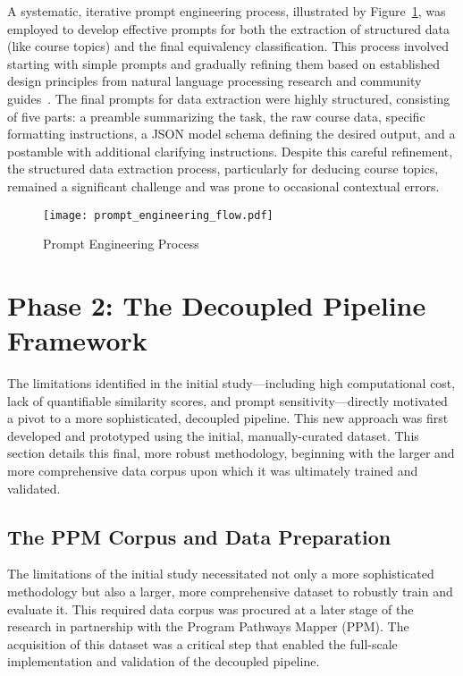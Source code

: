A systematic, iterative prompt engineering process, illustrated by Figure~\ref{fig:prompt_engineering_process}, was employed to develop effective prompts for both the extraction of structured data (like course topics) and the final equivalency classification. This process involved starting with simple prompts and gradually refining them based on established design principles from natural language processing research and community guides~\cite{ye2024promptengineeringpromptengineer,ppp,peg}. The final prompts for data extraction were highly structured, consisting of five parts: a preamble summarizing the task, the raw course data, specific formatting instructions, a JSON model schema defining the desired output, and a postamble with additional clarifying instructions. Despite this careful refinement, the structured data extraction process, particularly for deducing course topics, remained a significant challenge and was prone to occasional contextual errors.

\begin{figure}[tb]
    \captionsetup{skip=5pt}
    \centering
    \texttt{[image: prompt\_engineering\_flow.pdf]}
    \caption{Prompt Engineering Process}
    \label{fig:prompt_engineering_process}
\end{figure}

\section{Phase 2: The Decoupled Pipeline Framework}\label{ch:3.2}
The limitations identified in the initial study—including high computational cost, lack of quantifiable similarity scores, and prompt sensitivity—directly motivated a pivot to a more sophisticated, decoupled pipeline. This new approach was first developed and prototyped using the initial, manually-curated dataset. This section details this final, more robust methodology, beginning with the larger and more comprehensive data corpus upon which it was ultimately trained and validated.

\subsection{The PPM Corpus and Data Preparation}\label{ch:3.2.1}
The limitations of the initial study necessitated not only a more sophisticated methodology but also a larger, more comprehensive dataset to robustly train and evaluate it. This required data corpus was procured at a later stage of the research in partnership with the Program Pathways Mapper (PPM). The acquisition of this dataset was a critical step that enabled the full-scale implementation and validation of the decoupled pipeline.

